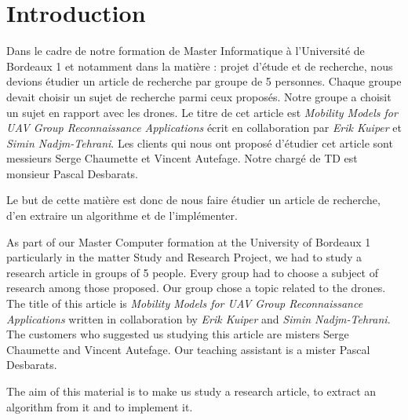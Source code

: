 \section*{Introduction}

Dans le cadre de notre formation de Master Informatique à l'Université de Bordeaux 1 et notamment dans la matière : projet d'étude et de recherche, nous devions étudier un article de recherche par groupe de 5 personnes. Chaque groupe devait choisir un sujet de recherche parmi ceux proposés. Notre groupe a choisit un sujet en rapport avec les drones. Le titre de cet article est \textit{Mobility Models for UAV Group Reconnaissance Applications} écrit en collaboration par \textit{Erik Kuiper} et \textit{Simin Nadjm-Tehrani}. Les clients qui nous ont proposé d'étudier cet article sont messieurs Serge Chaumette et Vincent Autefage. Notre chargé de TD est monsieur Pascal Desbarats.

Le but de cette matière est donc de nous faire étudier un article de recherche, d'en extraire un algorithme et de l'implémenter.

As part of our Master Computer formation at the University of Bordeaux 1 particularly in the matter Study and Research Project, we had to study a research article in groups of 5 people. Every group had to choose a subject of research among those proposed. Our group chose a topic related to the drones. The title of this article is \textit{Mobility Models for UAV Group Reconnaissance Applications} written in collaboration by \textit{Erik Kuiper} and \textit{Simin Nadjm-Tehrani}. The customers who suggested us studying this article are misters Serge Chaumette and Vincent Autefage. Our teaching assistant is a mister Pascal Desbarats.

The aim of this material is to make us study a research article, to extract an algorithm from it and to implement it.
